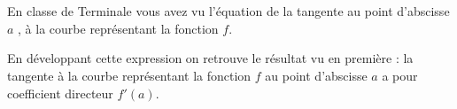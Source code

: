 \documentclass[11pt,a4paper]{article}
\newcommand{\cor}[1]{%
\begin{tcolorbox}[colback=red!5!white,colframe=red!75!black]
#1
\end{tcolorbox}
}
\begin{document}
\vfill 

\\[5 pt]

\vfill 

\\[5 pt]

\cor{
En classe de Terminale vous avez vu l'équation de la tangente au point d'abscisse $a$ , à la courbe représentant la fonction $f$. 

\vspace{0.5cm}
\fbox{$y=f'(a)(x-a)+f(a)$}

En développant cette expression on retrouve le résultat vu en première : la tangente à la courbe représentant la fonction $f$ au point d'abscisse $a$ a pour coefficient directeur $f'(a)$. 

\vspace{0.5cm}

}

\vfill 

\newpage
\end{document}
